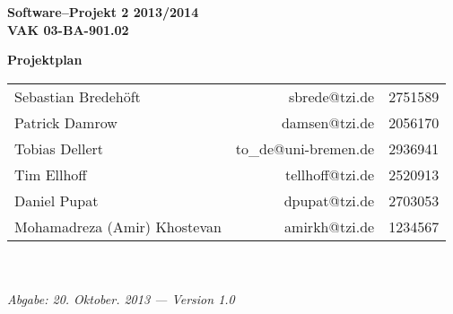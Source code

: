 \documentclass[fontsize=12pt,paper=a4,twoside]{scrartcl}
\begin{document}
  \thispagestyle{fancy}
  \fancyhead[LO,RE]{ }
  \fancyfoot[C]{}

  \vspace{3cm}

  \begin{minipage}[H]{\textwidth}
  \begin{center}
  \bf
  \Large
  Software--Projekt 2 2013/2014\\
  \smallskip
  \small
  VAK 03-BA-901.02\\
  \vspace{3cm}
  \end{center}
  \end{minipage}
  \begin{minipage}[H]{\textwidth}
  \begin{center}
  \vspace{1cm}
  \bf
  \Large Projektplan\\
  \vfill
  \end{center}
  \end{minipage}
  \vfill
  \begin{minipage}[H]{\textwidth}
  \begin{center}
  \sf
  \begin{tabular}{lrr}
  Sebastian Bredehöft & sbrede@tzi.de & 2751589\\
  Patrick Damrow & damsen@tzi.de & 2056170\\
  Tobias Dellert & to\_de@uni-bremen.de & 2936941\\
  Tim Ellhoff & tellhoff@tzi.de & 2520913\\
  Daniel Pupat & dpupat@tzi.de & 2703053\\
  Mohamadreza (Amir) Khostevan & amirkh@tzi.de & 1234567\\
  \end{tabular}
  \\ ~
  \vspace{2cm}
  \\
  \it Abgabe: 20. Oktober. 2013 --- Version 1.0\\ ~
  \end{center}
  \end{minipage}


\end{document}

